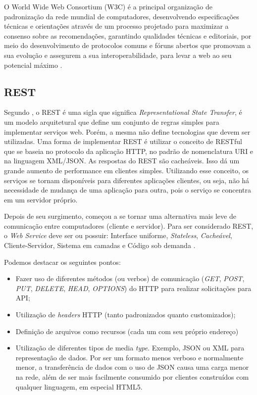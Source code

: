 O World Wide Web Consortium (W3C) é a principal organização de padronização da rede mundial de computadores, desenvolvendo especificações técnicas e orientações através de um processo projetado para maximizar a consenso sobre as recomendações, garantindo qualidades técnicas e editoriais, por meio do desenvolvimento de protocolos comuns e fóruns abertos que promovam a sua evolução e assegurem a sua interoperabilidade, para levar a web ao seu potencial máximo \cite{api:w3c}.

\subsection{REST}
Segundo , o REST é uma sigla que significa \textit{Representational State Transfer}, é um modelo arquitetural que define um conjunto de regras simples para implementar serviços web. Porém, a mesma não define tecnologias que devem ser utilizadas. Uma forma de implementar REST é utilizar o conceito de RESTful que se baseia no protocolo da aplicação HTTP, no padrão de nomenclatura URI e na linguagem XML/JSON. As respostas do REST são cacheáveis. Isso dá um grande aumento de performance em clientes simples. Utilizando esse conceito, os serviços se tornam disponíveis para diferentes aplicações clientes, ou seja, não há necessidade de mudança de uma aplicação para outra, pois o serviço se concentra em um servidor próprio. 

Depois de seu surgimento, começou a se tornar uma alternativa mais leve de comunicação entre computadores (cliente e servidor). Para ser considerado REST, o \textit{Web Service} deve ser ou possuir: Interface uniforme, \textit{Stateless}, \textit{Cacheável}, Cliente-Servidor, Sistema em camadas e Código sob demanda \cite{rest:roy}. 

Podemos destacar os seguintes pontos:
\begin{itemize}
    \item Fazer uso de diferentes métodos (ou verbos) de comunicação (\textit{GET}, \textit{POST}, \textit{PUT}, \textit{DELETE}, \textit{HEAD}, \textit{OPTIONS}) do HTTP para realizar solicitações para API; 
    \item Utilização de \textit{headers} HTTP (tanto padronizados quanto customizados); 
    \item Definição de arquivos como recursos (cada um com seu próprio endereço)
    \item Utilização de diferentes tipos de media \textit{type}. Exemplo, JSON ou XML para representação de dados. Por ser um formato menos verboso e normalmente menor, a transferência de dados com o uso de JSON causa uma carga menor na rede, além de ser mais facilmente consumido por clientes construídos com qualquer linguagem, em especial HTML5.
\end{itemize}

